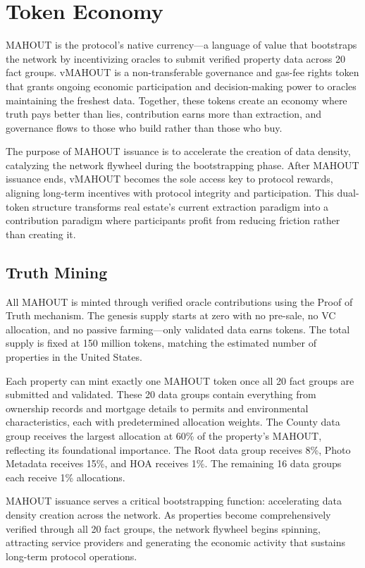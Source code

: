 \chapter{Token Economy}

MAHOUT is the protocol's native currency---a language of value that bootstraps the network by incentivizing oracles to submit verified property data across 20 fact groups. vMAHOUT is a non-transferable governance and gas-fee rights token that grants ongoing economic participation and decision-making power to oracles maintaining the freshest data. Together, these tokens create an economy where truth pays better than lies, contribution earns more than extraction, and governance flows to those who build rather than those who buy.

The purpose of MAHOUT issuance is to accelerate the creation of data density, catalyzing the network flywheel during the bootstrapping phase. After MAHOUT issuance ends, vMAHOUT becomes the sole access key to protocol rewards, aligning long-term incentives with protocol integrity and participation. This dual-token structure transforms real estate's current extraction paradigm into a contribution paradigm where participants profit from reducing friction rather than creating it.

\section{Truth Mining}

All MAHOUT is minted through verified oracle contributions using the Proof of Truth mechanism. The genesis supply starts at zero with no pre-sale, no VC allocation, and no passive farming---only validated data earns tokens. The total supply is fixed at 150 million tokens, matching the estimated number of properties in the United States.

Each property can mint exactly one MAHOUT token once all 20 fact groups are submitted and validated. These 20 data groups contain everything from ownership records and mortgage details to permits and environmental characteristics, each with predetermined allocation weights. The County data group receives the largest allocation at 60\% of the property's MAHOUT, reflecting its foundational importance. The Root data group receives 8\%, Photo Metadata receives 15\%, and HOA receives 1\%. The remaining 16 data groups each receive 1\% allocations.

MAHOUT issuance serves a critical bootstrapping function: accelerating data density creation across the network. As properties become comprehensively verified through all 20 fact groups, the network flywheel begins spinning, attracting service providers and generating the economic activity that sustains long-term protocol operations.


